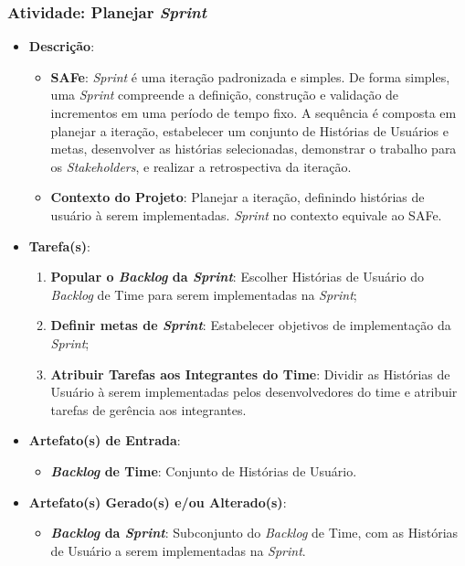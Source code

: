 			\subsubsection[Atividade: Planejar \emph{Sprint}]{Atividade: Planejar \emph{Sprint}}
			\label{subsubsec:processo_atividade_time_planejar}
				\begin{itemize}
					\item{\textbf{Descrição}:
						\begin{itemize}
							\item{\textbf{SAFe}: \emph{Sprint} é uma iteração padronizada e simples. De forma simples, uma \emph{Sprint} compreende a definição, construção e validação de incrementos em uma período de tempo fixo. A sequência é composta em planejar a iteração, estabelecer um conjunto de Histórias de Usuários e metas, desenvolver as histórias selecionadas, demonstrar o trabalho para os \emph{Stakeholders}, e realizar a retrospectiva da iteração.}
							\item{\textbf{Contexto do Projeto}: Planejar a iteração, definindo histórias de usuário à serem implementadas. \emph{Sprint} no contexto equivale ao SAFe.}
						\end{itemize}}
					\item{\textbf{Tarefa(s)}:
						\begin{enumerate}
							\item{\textbf{Popular o \emph{Backlog} da \emph{Sprint}}: Escolher Histórias de Usuário do \emph{Backlog} de Time para serem implementadas na \emph{Sprint};}
							\item{\textbf{Definir metas de \emph{Sprint}}: Estabelecer objetivos de implementação da \emph{Sprint};}
							\item{\textbf{Atribuir Tarefas aos Integrantes do Time}: Dividir as Histórias de Usuário à serem implementadas pelos desenvolvedores do time e atribuir tarefas de gerência aos integrantes.}
						\end{enumerate}}
					\item{\textbf{Artefato(s) de Entrada}:
						\begin{itemize}
							\item{\textbf{\emph{Backlog} de Time}: Conjunto de Histórias de Usuário.}
						\end{itemize}}
					\item{\textbf{Artefato(s) Gerado(s) e/ou Alterado(s)}:
						\begin{itemize}
							\item{\textbf{\emph{Backlog} da \emph{Sprint}}: Subconjunto do \emph{Backlog} de Time, com as Histórias de Usuário a serem implementadas na \emph{Sprint}.}

\end{itemize}}
\end{itemize}
